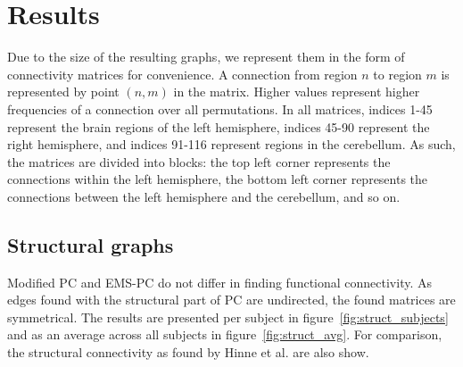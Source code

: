 \documentclass[a4paper, english]{article}
\begin{document}
\section{Results}\label{sec:results}
Due to the size of the resulting graphs, we represent them in the form of connectivity matrices for convenience.
A connection from region $n$ to region $m$ is represented by point $(n,m)$ in the matrix.
Higher values represent higher frequencies of a connection over all permutations.
In all matrices, indices 1-45 represent the brain regions of the left hemisphere, indices 45-90 represent the right hemisphere, and indices 91-116 represent regions in the cerebellum.
As such, the matrices are divided into blocks: the top left corner represents the connections within the left hemisphere, the bottom left corner represents the connections between the left hemisphere and the cerebellum, and so on.

\subsection{Structural graphs}
Modified PC and EMS-PC do not differ in finding functional connectivity.
As edges found with the structural part of PC are undirected, the found matrices are symmetrical.
The results are presented per subject in figure~\ref{fig:struct_subjects} and as an average across all subjects in figure~\ref{fig:struct_avg}.
For comparison, the structural connectivity as found by Hinne et al.\cite{hinne2013} are also show. 
\end{document}
